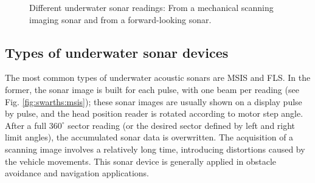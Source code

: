 \documentclass[final,5p,times]{elsarticle}
\begin{document}
\begin{figure}[t]
    \centering
    \captionsetup{justification=centering}
    \caption{Different underwater sonar readings: 
    From a mechanical scanning imaging sonar and 
    from a forward-looking sonar.}
    \label{fig:sonar_devices}
\end{figure}

\subsection{Types of underwater sonar devices}
\label{sonar:devices}

The most common types of underwater acoustic sonars are MSIS and FLS. In
the former, the sonar image is built for each pulse, with one beam per
reading (see Fig. \ref{fig:swarths:msis}); these sonar images are usually
shown on a display pulse by pulse, and the head position reader is rotated
according to motor step angle. After a full $360^{\circ}$ sector reading
(or the desired sector defined by left and right limit angles), the
accumulated sonar data is overwritten. The acquisition of a scanning image
involves a relatively long time, introducing distortions caused by the
vehicle movements. This sonar device is generally applied in obstacle
avoidance \cite{ganesan2015} and navigation \cite{ribas2010} applications.
\end{document}

